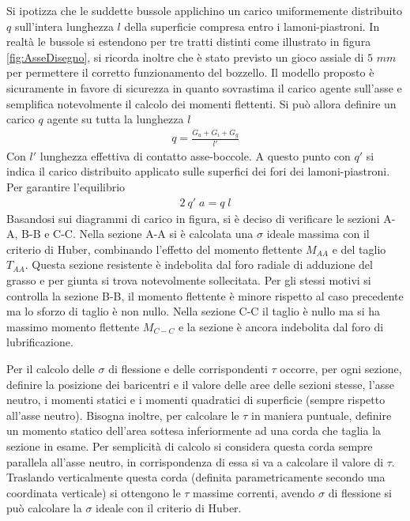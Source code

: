 Si ipotizza che le suddette bussole applichino un carico uniformemente distribuito $q$ sull'intera lunghezza $l$ della superficie compresa entro i lamoni-piastroni. 
In realtà le bussole si estendono per tre tratti distinti come illustrato in figura \ref{fig:AsseDisegno}, si ricorda inoltre che è stato previsto un gioco assiale di $5$ $mm$ per permettere il corretto funzionamento del bozzello. 
Il modello proposto è sicuramente in favore di sicurezza in quanto sovrastima il carico agente sull'asse e semplifica notevolmente il calcolo dei momenti flettenti. 
Si può allora definire un carico $q$ agente su tutta la lunghezza $l$
\begin{align*}
q = \frac{G_u+G_i+G_g}{l'}
\end{align*}
Con $l'$ lunghezza effettiva di contatto asse-boccole. 
A questo punto con $q'$ si indica il carico distribuito applicato sulle superfici dei fori dei lamoni-piastroni. Per garantire l'equilibrio 
\begin{align*}
2 \: q' \; a = q \; l
\end{align*}
Basandosi sui diagrammi di carico in figura, si è deciso di verificare le sezioni A-A, B-B e C-C. Nella sezione A-A si è calcolata una $\sigma$ ideale massima con il criterio di Huber, combinando l'effetto del momento flettente $M_{AA}$ e del taglio $T_{AA}$. Questa sezione resistente è indebolita dal foro radiale di adduzione del grasso e per giunta si trova notevolmente sollecitata. Per gli stessi motivi si controlla la sezione B-B, il momento flettente è minore rispetto al caso precedente ma lo sforzo di taglio è non nullo. 
Nella sezione C-C il taglio è nullo ma si ha massimo momento flettente $M_{C-C}$  e la sezione è ancora indebolita dal foro di lubrificazione. 

Per il calcolo delle $\sigma$ di flessione e delle corrispondenti $\tau$ occorre, per ogni sezione, definire la posizione dei baricentri e il valore delle aree delle sezioni stesse, l'asse neutro, i momenti statici e i momenti quadratici di superficie (sempre rispetto all'asse neutro). 
Bisogna inoltre, per calcolare le $\tau$ in maniera puntuale, definire un momento statico dell'area sottesa inferiormente ad una corda che taglia la sezione in esame. 
Per semplicità di calcolo si considera questa corda sempre parallela all'asse neutro, in corrispondenza di essa si va a calcolare il valore di $\tau$. 
Traslando verticalmente questa corda (definita parametricamente secondo una coordinata verticale) si ottengono le $\tau$ massime correnti, avendo $\sigma$ di flessione si può calcolare la $\sigma$ ideale con il criterio di Huber. 

